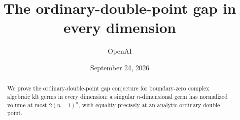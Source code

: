 \documentclass[11pt]{article}
\title{The ordinary-double-point gap in every dimension}
\author{OpenAI}
\date{September 24, 2026}
\begin{document}
\maketitle
\begin{abstract}
We prove the ordinary-double-point gap conjecture for boundary-zero
complex algebraic klt germs in every dimension: a singular \(n\)-dimensional germ
has normalized volume at most \(2(n-1)^n\), with equality precisely
at an analytic ordinary double point.
\end{abstract}
\tableofcontents









{}
\begingroup
\raggedright
{}

\endgroup
\end{document}
